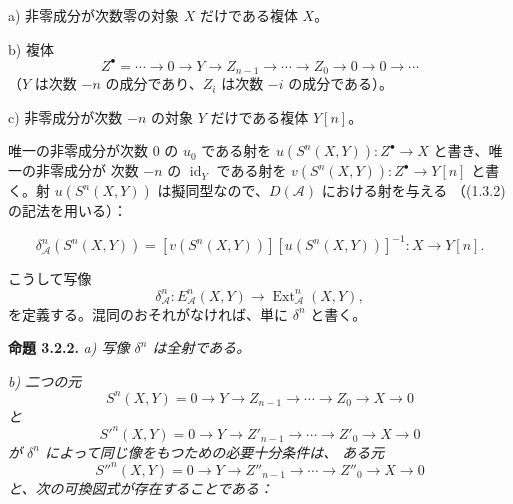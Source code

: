 \clearpage
{}%
\begingroup\small\setlength{\parskip}{0pt}\setlength{\emergencystretch}{1.5em}
\setlength{\abovedisplayskip}{4pt plus 2pt minus 2pt}%
\setlength{\belowdisplayskip}{4pt plus 2pt minus 2pt}%

\noindent a) 非零成分が次数零の対象 $X$ だけである複体 $X$。

\noindent b) 複体
\[
Z^\bullet=\cdots\longrightarrow0\longrightarrow Y
\longrightarrow Z_{n-1}\longrightarrow\cdots\longrightarrow Z_0
\longrightarrow0\longrightarrow0\longrightarrow\cdots
\]
（$Y$ は次数 $-n$ の成分であり、$Z_i$ は次数 $-i$ の成分である）。

\noindent c) 非零成分が次数 $-n$ の対象 $Y$ だけである複体 $Y[n]$。

唯一の非零成分が次数 $0$ の $u_0$ である射を
$u(S^n(X,Y))\colon Z^\bullet\longrightarrow X$ と書き、唯一の非零成分が
次数 $-n$ の $\operatorname{id}_Y$ である射を
$v(S^n(X,Y))\colon Z^\bullet\longrightarrow Y[n]$ と書く。射
$u(S^n(X,Y))$ は擬同型なので、$D(\mathcal A)$ における射を与える
（(1.3.2) の記法を用いる）：

\begin{equation}
\delta_{\mathcal A}^{n}(S^n(X,Y))=
[v(S^n(X,Y))][u(S^n(X,Y))]^{-1}\colon X\longrightarrow Y[n].
\tag{3.2.1.1}
\end{equation}

こうして写像
\begin{equation}
\delta_{\mathcal A}^{n}\colon E_{\mathcal A}^{n}(X,Y)
\longrightarrow\operatorname{Ext}_{\mathcal A}^{n}(X,Y),
\tag{3.2.1.2}
\end{equation}
を定義する。混同のおそれがなければ、単に $\delta^n$ と書く。

\medskip\noindent\textbf{命題 3.2.2.}\quad
\textit{a) 写像 $\delta^n$ は全射である。}

\noindent\textit{b) 二つの元}
\[
S^n(X,Y)=0\longrightarrow Y\longrightarrow Z_{n-1}
\longrightarrow\cdots\longrightarrow Z_0\longrightarrow X
\longrightarrow0
\]
\noindent\textit{と}
\[
{S'}^n(X,Y)=0\longrightarrow Y\longrightarrow Z'_{n-1}
\longrightarrow\cdots\longrightarrow Z'_0\longrightarrow X
\longrightarrow0
\]
\noindent\textit{が $\delta^n$ によって同じ像をもつための必要十分条件は、
ある元}
\[
{S''}^n(X,Y)=0\longrightarrow Y\longrightarrow Z''_{n-1}
\longrightarrow\cdots\longrightarrow Z''_0\longrightarrow X
\longrightarrow0
\]
\noindent\textit{と、次の可換図式が存在することである：}

